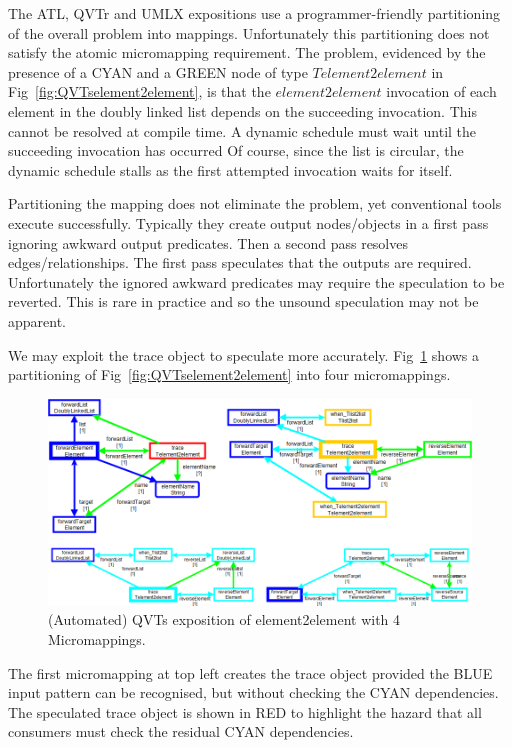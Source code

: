 \documentclass{llncs}
\begin{document}
The ATL, QVTr and UMLX expositions use a programmer-friendly partitioning of the overall problem into mappings. Unfortunately this partitioning does not satisfy the atomic micromapping requirement. The problem, evidenced by the presence of a CYAN and a GREEN node of type $Telement2element$ in Fig~\ref{fig:QVTselement2element}, is that the $element2element$ invocation of each element in the doubly linked list depends on the succeeding invocation. This cannot be resolved at compile time. A dynamic schedule must wait until the succeeding invocation has occurred Of course, since the list is circular, the dynamic schedule stalls as the first attempted invocation waits for itself.

Partitioning the mapping does not eliminate the problem, yet conventional tools execute successfully. Typically they create output nodes/objects in a first pass ignoring awkward output predicates. Then a second pass resolves edges/relationships. The first pass speculates that the outputs are required. Unfortunately the ignored awkward predicates may require the speculation to be reverted. This is rare in practice and so the unsound speculation may not be apparent.

We may exploit the trace object to speculate more accurately. Fig~\ref{fig:QVTsMicromappings} shows a partitioning of Fig~\ref{fig:QVTselement2element} into four micromappings.

\begin{figure}[h]
	\centering
	\includegraphics[width=1.0\textwidth]{QVTsMicromappings.png}
	\caption{(Automated) QVTs exposition of element2element with 4 Micromappings.}
	\label{fig:QVTsMicromappings}
\end{figure}

The first micromapping at top left creates the trace object provided the BLUE input pattern can be recognised, but without checking the CYAN dependencies. The speculated trace object is shown in RED to highlight the hazard that all consumers must check the residual CYAN dependencies.
\end{document}
